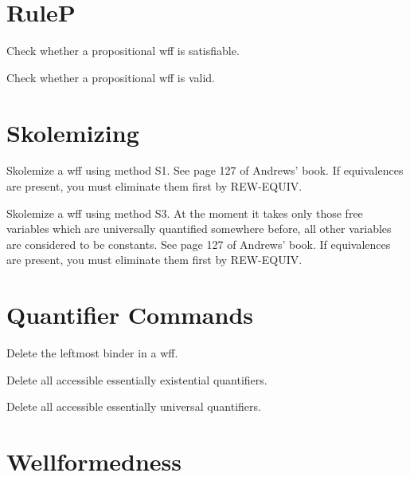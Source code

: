 \section{RuleP}

\begin{description} 
\item[SAT]  
Check whether a propositional wff is satisfiable.

\item[VALID]  
Check whether a propositional wff is valid.
\item
\end{description}

\section{Skolemizing}

\begin{description} 
\item[SK1]  
Skolemize a wff using method S1. See page 127 of Andrews' book.
   If equivalences are present, you must eliminate them first by REW-EQUIV.

\item[SK3]  
Skolemize a wff using method S3.  At the moment it takes only
those free variables which are universally quantified somewhere before,
all other variables are considered to be constants.
    See page 127 of Andrews' book.
    If equivalences are present, you must eliminate them first by REW-EQUIV.
\item
\end{description}

\section{Quantifier Commands}

\begin{description} 
\item[DB]  
Delete the leftmost binder in a wff.

\item[EP]  
Delete all accessible essentially existential quantifiers.

\item[OP]  
Delete all accessible essentially universal quantifiers.
\item
\end{description}

\section{Wellformedness}

